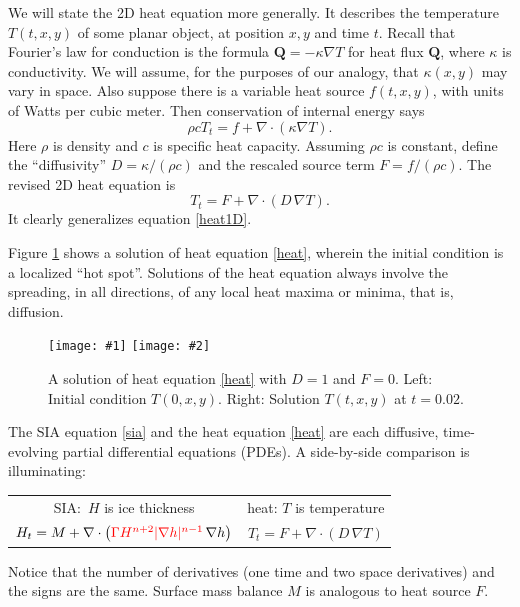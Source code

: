 \documentclass[letterpaper,final,12pt,reqno]{amsart}
\newcommand{\grad}{\nabla}
\newcommand{\Div}{\nabla\cdot}
\newcommand{\twofigsizes}[5]{
\begin{figure}[ht]
\centering
\texttt{[image: \#1]} \quad
\texttt{[image: \#2]}
\caption{#3}
\label{fig:#1}
\end{figure}}
\begin{document}
We will state the 2D heat equation more generally.  It describes the temperature $T(t,x,y)$ of some planar object, at position $x,y$ and time $t$.  Recall that Fourier's law for conduction is the formula $\mathbf{Q} = - \kappa \grad T$ for heat flux $\mathbf{Q}$, where $\kappa$ is conductivity.  We will assume, for the purposes of our analogy, that $\kappa(x,y)$ may vary in space.  Also suppose there is a variable heat source $f(t,x,y)$, with units of Watts per cubic meter.  Then conservation of internal energy says
\begin{equation}
\rho c T_t = f + \Div (\kappa \grad T). \label{heatearly}
\end{equation}
Here $\rho$ is density and $c$ is specific heat capacity.  Assuming $\rho c$ is constant, define the ``diffusivity'' $D=\kappa/(\rho c)$ and the rescaled source term $F = f/(\rho c)$.  The revised 2D heat equation is
\begin{equation}
T_t = F + \Div (D\, \grad T). \label{heat}
\end{equation}
It clearly generalizes equation \eqref{heat1D}.

Figure \ref{fig:initialheat} shows a solution of heat equation \eqref{heat}, wherein the initial condition is a localized ``hot spot''.  Solutions of the heat equation always involve the spreading, in all directions, of any local heat maxima or minima, that is, diffusion.

\twofigsizes{initialheat}{finalheat}{A solution of heat equation \eqref{heat} with $D=1$ and $F=0$.  Left: Initial condition $T(0,x,y)$.   Right: Solution $T(t,x,y)$ at $t=0.02$.}{2.8in}{2.8in}

The SIA equation \eqref{sia} and the heat equation \eqref{heat} are each diffusive, time-evolving partial differential equations (PDEs).  A side-by-side comparison is illuminating:
\begin{center}
\begin{tabular}{cc}
\vspace{1mm}
SIA:\, $H$ is ice thickness & \phantom{foo bar} heat: $T$ is temperature\phantom{foo bar}  \\
\vspace{1mm}
	$H_t = M + \Div \left({\color{red}\Gamma H^{n+2} |\grad h|^{n-1}}\, \grad h \right)$  &  $T_t = F + \Div (D\, \grad T)$
\end{tabular}
\end{center}
\vspace{1mm}
Notice that the number of derivatives (one time and two space derivatives) and the signs are the same.  Surface mass balance $M$ is analogous to heat source $F$.  
\end{document}
